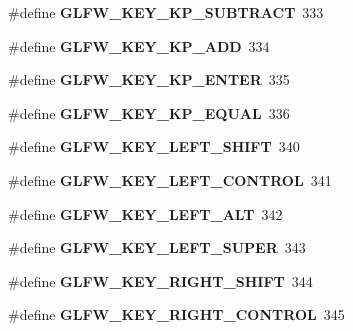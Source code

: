 \begin{DoxyCompactItemize}
\item 
\mbox{\label{group__keys_gaa3dbd60782ff93d6082a124bce1fa236}} 
\#define {\bfseries G\+L\+F\+W\+\_\+\+K\+E\+Y\+\_\+\+K\+P\+\_\+\+S\+U\+B\+T\+R\+A\+CT}~333
\item 
\mbox{\label{group__keys_gad09c7c98acc79e89aa6a0a91275becac}} 
\#define {\bfseries G\+L\+F\+W\+\_\+\+K\+E\+Y\+\_\+\+K\+P\+\_\+\+A\+DD}~334
\item 
\mbox{\label{group__keys_ga4f728f8738f2986bd63eedd3d412e8cf}} 
\#define {\bfseries G\+L\+F\+W\+\_\+\+K\+E\+Y\+\_\+\+K\+P\+\_\+\+E\+N\+T\+ER}~335
\item 
\mbox{\label{group__keys_gaebdc76d4a808191e6d21b7e4ad2acd97}} 
\#define {\bfseries G\+L\+F\+W\+\_\+\+K\+E\+Y\+\_\+\+K\+P\+\_\+\+E\+Q\+U\+AL}~336
\item 
\mbox{\label{group__keys_ga8a530a28a65c44ab5d00b759b756d3f6}} 
\#define {\bfseries G\+L\+F\+W\+\_\+\+K\+E\+Y\+\_\+\+L\+E\+F\+T\+\_\+\+S\+H\+I\+FT}~340
\item 
\mbox{\label{group__keys_ga9f97b743e81460ac4b2deddecd10a464}} 
\#define {\bfseries G\+L\+F\+W\+\_\+\+K\+E\+Y\+\_\+\+L\+E\+F\+T\+\_\+\+C\+O\+N\+T\+R\+OL}~341
\item 
\mbox{\label{group__keys_ga7f27dabf63a7789daa31e1c96790219b}} 
\#define {\bfseries G\+L\+F\+W\+\_\+\+K\+E\+Y\+\_\+\+L\+E\+F\+T\+\_\+\+A\+LT}~342
\item 
\mbox{\label{group__keys_gafb1207c91997fc295afd1835fbc5641a}} 
\#define {\bfseries G\+L\+F\+W\+\_\+\+K\+E\+Y\+\_\+\+L\+E\+F\+T\+\_\+\+S\+U\+P\+ER}~343
\item 
\mbox{\label{group__keys_gaffca36b99c9dce1a19cb9befbadce691}} 
\#define {\bfseries G\+L\+F\+W\+\_\+\+K\+E\+Y\+\_\+\+R\+I\+G\+H\+T\+\_\+\+S\+H\+I\+FT}~344
\item 
\mbox{\label{group__keys_gad1ca2094b2694e7251d0ab1fd34f8519}} 
\#define {\bfseries G\+L\+F\+W\+\_\+\+K\+E\+Y\+\_\+\+R\+I\+G\+H\+T\+\_\+\+C\+O\+N\+T\+R\+OL}~345
\item 

\end{DoxyCompactItemize}
